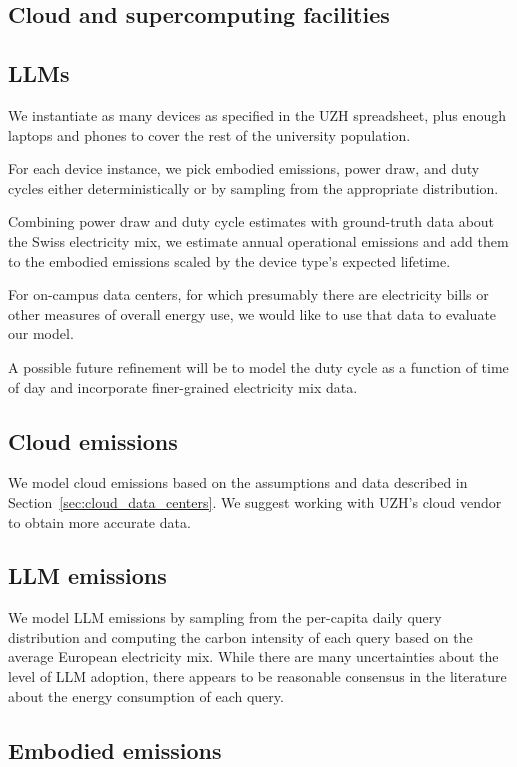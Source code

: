 \documentclass[11pt]{article}
\begin{document}
\subsection{Cloud and supercomputing facilities}

\subsection{LLMs}

We instantiate as many devices as specified in the UZH spreadsheet, plus enough laptops and phones
to cover the rest of the university population.

For each device instance, we pick embodied emissions, power draw, and duty cycles either
deterministically or by sampling from the appropriate distribution.

Combining power draw and duty cycle estimates with ground-truth data about the Swiss electricity mix,
we estimate annual operational emissions and add them to the embodied emissions scaled by the device
type's expected lifetime.

For on-campus data centers, for which presumably there are electricity bills or other measures of
overall energy use, we would like to use that data to evaluate our model.

A possible future refinement will be to model the duty cycle as a function of time of day
and incorporate finer-grained electricity mix data.

\subsection{Cloud emissions}

We model cloud emissions based on the assumptions and data described in
Section~\ref{sec:cloud_data_centers}. We suggest working with UZH's cloud vendor to obtain
more accurate data.

\subsection{LLM emissions}

We model LLM emissions by sampling from the per-capita daily query distribution and computing
the carbon intensity of each query based on the average European electricity mix. While there
are many uncertainties about the level of LLM adoption, there appears to be reasonable consensus
in the literature about the energy consumption of each query.

\subsection{Embodied emissions}
\end{document}

